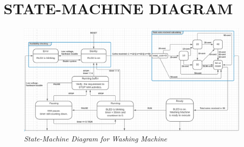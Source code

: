 \documentclass[13pt,a4paper]{article}
\begin{document}
	
	\newpage
	
	
	\section{STATE-MACHINE DIAGRAM}
	\begin{figure}[h!]
		\begin{center}
			\includegraphics[width=17cm]{diagram.png}
			\caption{\textit{State-Machine Diagram for Washing Machine}}
		\end{center}
	\end{figure} 
\end{document}

